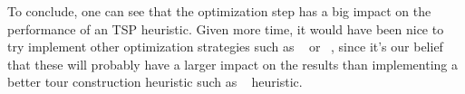 To conclude, one can see that the optimization step has a big impact on the
performance of an TSP heuristic. Given more time, it would have been nice to
try implement other optimization strategies such as
~\cite{wikipedia:3-opt} or
~\cite{wikipedia:lin}, 
since it's our belief that these will probably have a
larger impact on the results than implementing a better tour construction
heuristic such as ~\cite{wikipedia:christofides} heuristic.
